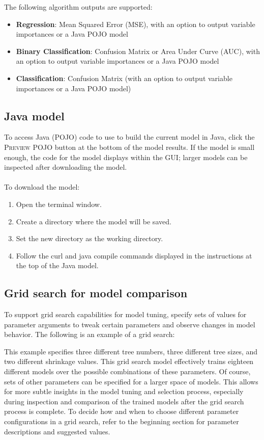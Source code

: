 The following algorithm outputs are supported:
\begin{itemize}
\item {\bf{Regression}}: Mean Squared Error (MSE), with an option to output variable importances or a Java POJO model
\item {\bf{Binary Classification}}: Confusion Matrix or Area Under Curve (AUC), with an option to output variable
importances or a Java POJO model
\item {\bf{Classification}}: Confusion Matrix (with an option to output variable importances or a Java POJO model)
\end{itemize}

\subsection{Java model}

To access Java (POJO) code to use to build the current model in Java, click the \textsc{Preview POJO} button at the
bottom of the model results. If the model is small enough, the code for the model displays within the GUI; larger
models can be inspected after downloading the model.
\\
\\
To download the model:
\begin{enumerate}
\item Open the terminal window.
\item Create a directory where the model will be saved.
\item Set the new directory as the working directory.
\item Follow the curl and java compile commands displayed in the instructions at the top of the Java model.
\end{enumerate}


\subsection{Grid search for model comparison}

To support grid search capabilities for model tuning,  specify sets of values for parameter arguments to tweak
certain parameters and observe changes in model behavior. The following is an example of a grid search:

\newpage
\waterExampleInR


This example specifies three different tree numbers, three different tree sizes, and two different shrinkage values.
This grid search model effectively trains eighteen different models over the possible combinations of these parameters.
Of course, sets of other parameters can be specified for a larger space of models. This allows for more subtle
insights in the model tuning and selection process, especially during inspection and comparison of the trained
models after the grid search process is complete. To decide how and when to choose different parameter configurations
in a grid search, refer to the beginning section for parameter descriptions and suggested values.

